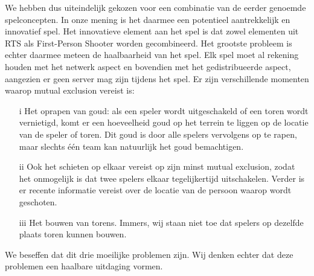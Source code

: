 We hebben dus uiteindelijk gekozen voor een combinatie van de eerder genoemde spelconcepten. In onze mening is het daarmee een potentieel aantrekkelijk en innovatief spel. Het innovatieve element aan het spel is dat zowel elementen uit RTS als First-Person Shooter worden gecombineerd. Het grootste probleem is echter daarmee meteen de haalbaarheid van het spel. Elk spel moet al rekening houden met het netwerk aspect en bovendien met het gedistribueerde aspect, aangezien er geen server mag zijn tijdens het spel. Er zijn verschillende momenten waarop mutual exclusion vereist is:

\begin{enumerate}
\item[i] Het oprapen van goud: als een speler wordt uitgeschakeld of een toren wordt vernietigd, komt er een hoeveelheid goud op het terrein te liggen op de locatie van de speler of toren. Dit goud is door alle spelers vervolgens op te rapen, maar slechts \'e\'en team kan natuurlijk het goud bemachtigen.
\item[ii] Ook het schieten op elkaar vereist op zijn minst mutual exclusion, zodat het onmogelijk is dat twee spelers elkaar tegelijkertijd uitschakelen. Verder is er recente informatie vereist over de locatie van de persoon waarop wordt geschoten.
\item[iii] Het bouwen van torens. Immers, wij staan niet toe dat spelers op dezelfde plaats toren kunnen bouwen.
\end{enumerate}

We beseffen dat dit drie moeilijke problemen zijn. Wij denken echter dat deze problemen een haalbare uitdaging vormen. 